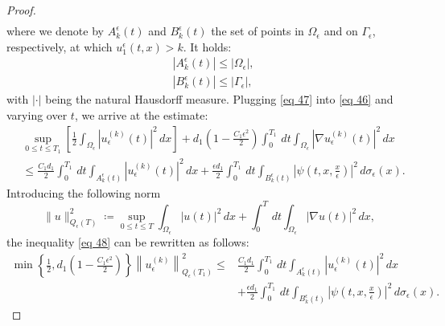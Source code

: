 \begin{proof}
\begin{equation}
\begin{aligned}
   \end{aligned}
\label{eq 47}\end{equation}
where we denote by $A_{k}^{\epsilon}(t)$ and $B_{k}^{\epsilon}(t)$ the set of points in $\Omega_{\epsilon}$ and on $\Gamma_{\epsilon}$, respectively, at which $u_{1}^{\epsilon}(t, x)>k$. It holds:
$$
\begin{aligned}
&\left|A_{k}^{\epsilon}(t)\right| \leq\left|\Omega_{\epsilon}\right|, \\
&\left|B_{k}^{\epsilon}(t)\right| \leq\left|\Gamma_{\epsilon}\right|,
\end{aligned}
$$
with $|\cdot|$ being the natural Hausdorff measure.
Plugging \eqref{eq 47} into \eqref{eq 46} and varying over $t$, we arrive at the estimate: 
\begin{equation}
  \begin{aligned}
&\sup _{0 \leq t \leq T_{1}}\left[\frac{1}{2} \int_{\Omega_{\epsilon}}\left|u_{\epsilon}^{(k)}(t)\right|^{2} \, d  x\right]+d_{1}\left(1-\frac{C_{1} \epsilon^{2}}{2}\right) \int_{0}^{T_{1}} \, d  t \int_{\Omega_{\epsilon}}\left|\nabla u_{\epsilon}^{(k)}(t)\right|^{2} \, d  x \\
&\leq \frac{C_{1} d_{1}}{2} \int_{0}^{T_{1}} \, d  t \int_{A_{k}^{\epsilon}(t)}\left|u_{\epsilon}^{(k)}(t)\right|^{2} \, d  x+\frac{\epsilon d_{1}}{2} \int_{0}^{T_{1}} \, d  t \int_{B_{k}^{\epsilon}(t)}\left|\psi\left(t, x, \frac{x}{\epsilon}\right)\right|^{2} \, d  \sigma_{\epsilon}(x).
\end{aligned}
\label{eq 48}\end{equation}
Introducing the following norm
\begin{equation}
  \|u\|_{Q_{\epsilon}(T)}^{2}\coloneqq \sup _{0 \leq t \leq T} \int_{\Omega_{\epsilon}}|u(t)|^{2} \, d  x+\int_{0}^{T} \, d  t \int_{\Omega_{\epsilon}}|\nabla u(t)|^{2} \, d  x,
\label{eq 49}\end{equation}
the inequality \eqref{eq 48} can be rewritten as follows:
\begin{equation}
  \begin{aligned}
\min \left\{\frac{1}{2}, d_{1}\left(1-\frac{C_{1} \epsilon^{2}}{2}\right)\right\}\left\|u_{\epsilon}^{(k)}\right\|_{Q_{\epsilon}\left(T_{1}\right)}^{2} \leq & \frac{C_{1} d_{1}}{2} \int_{0}^{T_{1}} \, d  t \int_{A_{k}^{\epsilon}(t)}\left|u_{\epsilon}^{(k)}(t)\right|^{2} \, d  x \\
&+\frac{\epsilon d_{1}}{2} \int_{0}^{T_{1}} \, d  t \int_{B_{k}^{\epsilon}(t)}\left|\psi\left(t, x, \frac{x}{\epsilon}\right)\right|^{2} \, d  \sigma_{\epsilon}(x).

\end{aligned}
\end{equation}
\end{proof}
